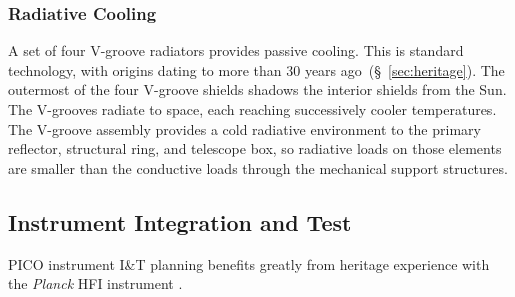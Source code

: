 

\subsubsection{Radiative Cooling}
\label{sec:radiative_cooling} %

A set of four V-groove radiators provides passive cooling. This is standard technology, with origins dating to more than 30 years ago~(\S~\ref{sec:heritage}). The outermost of the four V-groove shields shadows the interior shields from the Sun. The V-grooves radiate to space, each reaching successively cooler temperatures.  The V-groove assembly provides a cold radiative environment to the primary reflector, structural ring, and telescope box, so radiative loads on those elements are smaller than the conductive loads through the mechanical support structures. 


\subsection{Instrument Integration and Test}
\label{sec:iandt} %

PICO instrument I\&T planning benefits greatly from heritage
experience with the \textit{Planck} HFI instrument \citep{ Pajot2010}.

